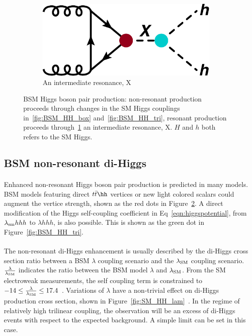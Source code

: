 \begin{figure}[htbp!]
\begin{subfigure}[b]{0.3\textwidth}
        \includegraphics[width=\textwidth]{figures/theory/BSM_HH_X}
        \caption{An intermediate resonance, X}
        \label{fig:BSM_HH_X}
    \end{subfigure}
\caption{BSM Higgs boson pair production: non-resonant production proceeds through changes in the SM Higgs couplings in~\ref{fig:BSM_HH_box} and~\ref{fig:BSM_HH_tri}, resonant production proceeds through~\ref{fig:BSM_HH_X} an intermediate resonance, X. $H$ and $h$ both refers to the SM Higgs.}
\label{fig:BSM_HH}
\end{figure}


\subsection{BSM non-resonant di-Higgs}
\paragraph{}
Enhanced non-resonant Higgs boson pair production is predicted in many models. BSM models featuring direct $t\bar{t}\hh$ vertices \cite{Grober:2010yv, Contino:2012xk} or new light colored scalars \cite{PhysRevD.86.095023} could augment the vertice strength, shown as the red dots in Figure~\ref{fig:BSM_HH}. 
A direct modification of the Higgs self-coupling coefficient in Eq~\ref{eqn:higgspotential}, from $\lambda_{\rm sm}hhh$ to $\lambda hhh$, is also possible. 
This is shown as the green dot in Figure~\ref{fig:BSM_HH_tri}. 

\paragraph{}
The non-resonant di-Higgs enhancement is usually described by the di-Higgs cross section ratio between a BSM $\lambda$ coupling scenario and the $\lambda_{\rm SM}$ coupling scenario.
$\frac{\rm \lambda}{\rm \lambda_{\rm SM}}$ indicates the ratio between the BSM model $\lambda$ and $\lambda_{\rm SM}$.
From the SM electroweak measurements, the self coupling term is constrained to $-14 \leq \frac{\rm \lambda}{\rm \lambda_{\rm SM}} \leq 17.4$~\cite{Kribs:2017znd}. 
Variations of $\lambda$ have a non-trivial effect on di-Higgs production cross section, shown in Figure~\ref{fig:SM_HH_lam}~\cite{Frederix:2014hta}. 
In the regime of relatively high trilinear coupling, the observation will be an excess of di-Higgs events with respect to the expected background. 
A simple limit can be set in this case.

